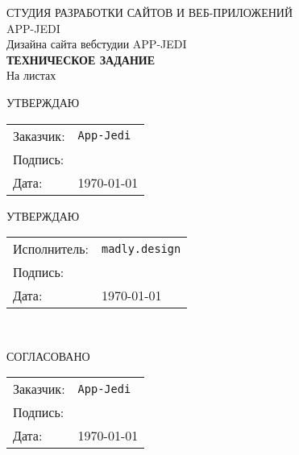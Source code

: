 %
\begin{center}
{\Large {{СТУДИЯ РАЗРАБОТКИ САЙТОВ И ВЕБ-ПРИЛОЖЕНИЙ \\ {\LARGE APP-JEDI}}}}\\[4cm]

{\huge Дизайна сайта вебстудии {\LARGE APP-JEDI }} \\[0.5cm]
{ \Huge \bf ТЕХНИЧЕСКОЕ ЗАДАНИЕ}\\[0.5cm]
На \pageref{LastPage} листах\\[3.5cm]

\begin{minipage}{\textwidth}
  \begin{minipage}{0.5\textwidth}

    \begin{flushleft}
      \begin{center}
        {\large УТВЕРЖДАЮ}\\
      \end{center}
      \begin{tabular}{ll}
        Заказчик: & \texttt{App-Jedi}\\
        Подпись: & \\
        Дата: & \today
      \end{tabular}
    \end{flushleft}
  \end{minipage}
  \begin{minipage}{0.5\textwidth}
    \begin{flushleft}
      \begin{center}
        {\large УТВЕРЖДАЮ}\\
      \end{center}
      \begin{tabular}{ll}
        Исполнитель: & \texttt{madly.design}\\
        Подпись: & \\
        Дата: & \today
      \end{tabular}
    \end{flushleft}
  \end{minipage}
\end{minipage}
\\[5cm]

\begin{flushleft}
\begin{minipage}{0.5\textwidth}
\begin{center}
  СОГЛАСОВАНО
\end{center}
\begin{tabular}{ll}
  Заказчик: & \texttt{App-Jedi}\\
  Подпись: & \\
  Дата: & \today
\end{tabular}
\end{minipage}
\end{flushleft}
\end{center}
\thispagestyle{empty}
